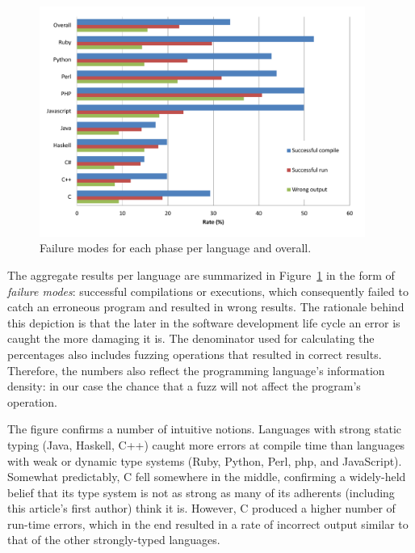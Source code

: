 \documentclass[10pt]{sigplanconf}
\begin{document}
\begin{figure}
        \begin{center}
                \includegraphics[width=0.95\textwidth]{chart}
        \end{center}
        \caption{Failure modes for each phase per language and overall.}
        \label{fig:results}
\end{figure}

The aggregate results per language are summarized in Figure~\ref{fig:results}
in the form of {\em failure modes}:
successful compilations or executions, which consequently failed to catch an
erroneous program and resulted in wrong results.
The rationale behind this depiction is that the later in the software
development life cycle an error is caught the more damaging it is.
The denominator used for calculating the percentages also includes
fuzzing operations that resulted in correct results.
Therefore, the numbers also reflect the programming language's
information density:
in our case the chance that a fuzz will not affect the program's operation.

The figure confirms a number of intuitive notions.
Languages with strong static typing \cite{Pie02} (Java, Haskell, C++)
caught more errors at compile time than languages
with weak or dynamic type systems
(Ruby, Python, Perl, {\sc php}, and JavaScript).
Somewhat predictably, C fell somewhere in the middle,
confirming a widely-held belief that its type system is not as strong
as many of its adherents (including this article's first author)
think it is.
However, C produced a higher number of run-time errors,
which in the end resulted in a rate of incorrect output
similar to that of the other strongly-typed languages.
\end{document}
